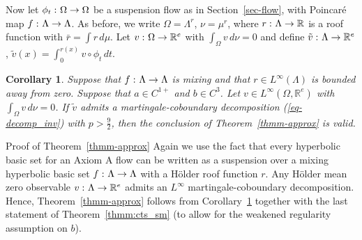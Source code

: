 \documentclass[aop,MSNbibl,seceqn,dvips]{arximspdf}
\newcommand{\eqref}[1]{(\ref{#1})}
\newtheorem{cor}[thmm]{Corollary}
\newcommand{\R}{\mathbb{R}}
\newcommand{\BBW}{\mathbb{W}}
\newcommand{\tildev}{\tilde{v}}
\begin{document}
Now let $\phi_t\dvtx\Omega\to\Omega$ be a suspension flow as in
Section~\ref{sec-flow},
with Poincar\'e map $f\dvtx\Lambda\to\Lambda$. As before, we write
$\Omega=\Lambda^r$, $\nu=\mu^r$, where $r\dvtx\Lambda\to\R$ is
a roof
function with
$\bar r=\int r \,d\mu$.
Let $v\dvtx\Omega\to\R^e$ with $\int_\Omega v \,d\nu=0$
and define $\tildev\dvtx\Lambda\to\R^e$,
$\tildev(x)=\int_0^{r(x)}v\circ\phi_t \,dt$.

\begin{cor} \label{cor-approx}
Suppose that $f\dvtx\Lambda\to\Lambda$ is mixing and that $r\in
L^\infty
(\Lambda)$ is bounded away from zero.
Suppose that $a\in C^{1+}$ and $b\in C^3$.
Let $v\in L^\infty(\Omega,\R^e)$ with \mbox{$\int_\Omega v \,d\nu=0$}.
If $\tildev$ admits
a martingale-coboundary decomposition \eqref{eq-decomp_inv} with
$p>\frac{9}2$, then
the conclusion of Theorem~\ref{thmm-approx} is valid.
\end{cor}


\begin{pf*}{Proof of Theorem~\ref{thmm-approx}}
Again we use the fact that every hyperbolic basic set for an Axiom A
flow can
be written as a suspension over a mixing hyperbolic basic set $f\dvtx
\Lambda
\to\Lambda$ with a H\"older roof function $r$.
Any H\"older mean zero observable $v\dvtx\Lambda\to\R^e$ admits
an $L^\infty$ martingale-coboundary decomposition.
Hence, Theorem~\ref{thmm-approx} follows from Corollary~\ref{cor-approx}
together with the last statement of Theorem~\ref{thmm:cts_sm} (to allow
for the weakened regularity assumption on $b$).
\end{pf*}

\end{document}
